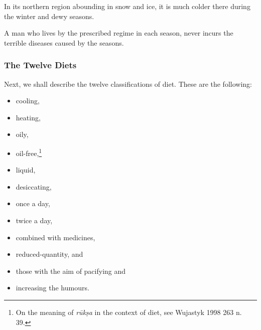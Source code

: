 \begin{translation}
	\item[74]
	In its northern region abounding in snow and ice, %
	it is much %
	colder there during the winter %
	and dewy seasons.%

	\item[75]
	A man who lives by the prescribed regime in each season, %
	never %
	incurs the terrible diseases caused by the seasons.

	\subsubsection{The Twelve Diets}

	\item[76] %
	Next, %
	we shall describe the twelve classifications of diet. %
	These are the following: %
	\begin{itemize}
		\item cooling, %
		\item heating,
		\item oily,
		\item oil-free,\footnote{
			      On the meaning of \emph{rūkṣa} in the context of diet, see  Wujastyk 1998 263 n. 39.
		      }
		\item liquid,
		\item desiccating, %
		\item once a day, %
		\item twice a day, %
		\item combined with medicines, %
		\item reduced-quantity, %
		      and \item those with the aim of pacifying and %
		\item increasing the humours. %
	\end{itemize}


\end{translation}
